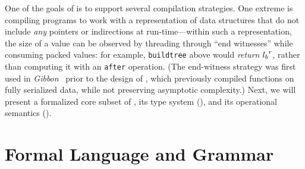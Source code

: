 \documentclass[showabstract,showacknowledgments,showpreface,showdedication]{iuphd}
\theoremstyle{nonumberplain}
\begin{document}
{One of the goals of \ourcalc{} is to support several compilation
  strategies. One extreme is compiling programs to work with a representation of
  data structures that do not include \emph{any} pointers or indirections at
  run-time---within such a representation, the size of a value can be observed
  by threading through ``end witnesses'' while consuming packed values: for
  example, \lstinline[mathescape]{buildtree} above would \emph{return} ${l_b}^{r}$, rather than computing
  it with an \lstinline[mathescape]{after} operation.
  (The end-witness strategy was first used in
  {\em Gibbon}~\cite{ecoop17-gibbon} prior to the design of \ourcalc{},
  which previously compiled functions on fully serialized data,
  while not preserving asymptotic complexity.)
}
%
%
%
%
Next, we will present a formalized core subset of \ourcalc, 
its type system (),
and its operational semantics ().

\section{Formal Language and Grammar}
\label{subsec:grammar}
\end{document}
